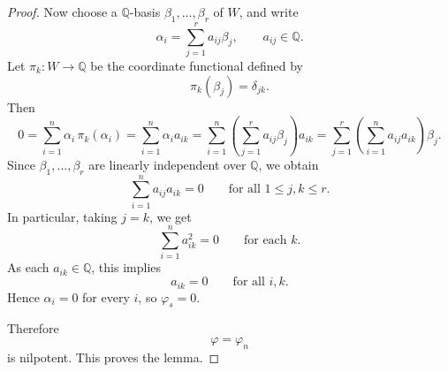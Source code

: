 \begin{proof}
    Now choose a $\mathbb{Q}$-basis $\beta_1,\dots,\beta_r$ of $W$, and write
    \[
        \alpha_i=\sum_{j=1}^r a_{ij}\beta_j,
        \qquad a_{ij}\in\mathbb{Q}.
    \]
    Let $\pi_k:W\to\mathbb{Q}$ be the coordinate functional defined by
    \[
        \pi_k(\beta_j)=\delta_{jk}.
    \]
    Then
    \[
        0=\sum_{i=1}^n \alpha_i\,\pi_k(\alpha_i)
        =\sum_{i=1}^n \alpha_i a_{ik}
        =\sum_{i=1}^n \left(\sum_{j=1}^r a_{ij}\beta_j\right)a_{ik}
        =\sum_{j=1}^r \left(\sum_{i=1}^n a_{ij}a_{ik}\right)\beta_j.
    \]
    Since $\beta_1,\dots,\beta_r$ are linearly independent over $\mathbb{Q}$, we obtain
    \[
        \sum_{i=1}^n a_{ij}a_{ik}=0
        \qquad
        \text{for all }1\le j,k\le r.
    \]
    In particular, taking $j=k$, we get
    \[
        \sum_{i=1}^n a_{ik}^2=0
        \qquad
        \text{for each }k.
    \]
    As each $a_{ik}\in\mathbb{Q}$, this implies
    \[
        a_{ik}=0
        \qquad
        \text{for all }i,k.
    \]
    Hence $\alpha_i=0$ for every $i$, so $\varphi_s=0$.

    Therefore
    \[
        \varphi=\varphi_n
    \]
    is nilpotent. This proves the lemma.
\end{proof}

